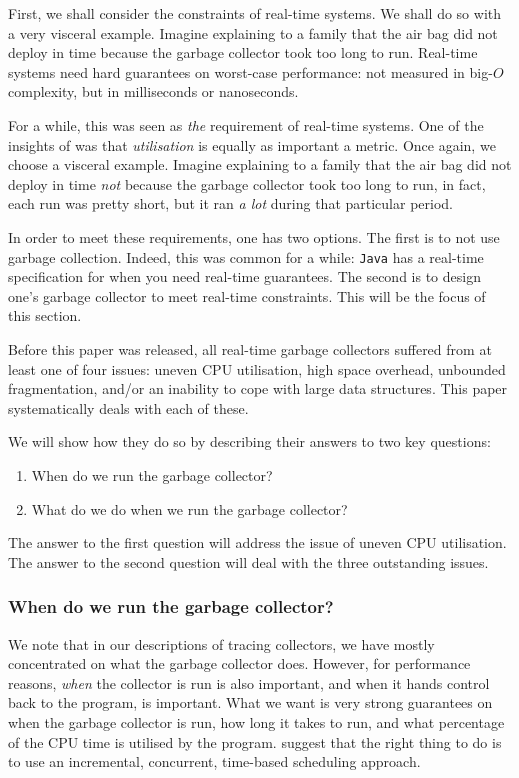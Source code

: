 First, we shall consider the constraints of real-time systems. We shall do so with a very visceral example. Imagine explaining to a family that the air bag did not deploy in time because the garbage collector took too long to run. Real-time systems need hard guarantees on worst-case performance: not measured in big-$O$ complexity, but in milliseconds or nanoseconds. 

For a while, this was seen as \textit{the} requirement of real-time systems. One of the insights of \citet{bacon-2003} was that \textit{utilisation} is equally as important a metric. Once again, we choose a visceral example. Imagine explaining to a family that the air bag did not deploy in time \textit{not} because the garbage collector took too long to run, in fact, each run was pretty short, but it ran \textit{a lot} during that particular period. 

In order to meet these requirements, one has two options. The first is to not use garbage collection. Indeed, this was common for a while: \texttt{Java} has a real-time specification for when you need real-time guarantees. The second is to design one's garbage collector to meet real-time constraints. This will be the focus of this section.

Before this paper was released, all real-time garbage collectors suffered from at least one of four issues: uneven CPU utilisation, high space overhead, unbounded fragmentation, and/or an inability to cope with large data structures. This paper systematically deals with each of these.

We will show how they do so by describing their answers to two key questions:
\begin{enumerate}
    \item When do we run the garbage collector?
    \item What do we do when we run the garbage collector?
\end{enumerate}

The answer to the first question will address the issue of uneven CPU utilisation. The answer to the second question will deal with the three outstanding issues.

\subsubsection{When do we run the garbage collector?}
We note that in our descriptions of tracing collectors, we have mostly concentrated on what the garbage collector does. However, for performance reasons, \textit{when} the collector is run is also important, and when it hands control back to the program, is important. What we want is very strong guarantees on when the garbage collector is run, how long it takes to run, and what percentage of the CPU time is utilised by the program. \citet{bacon-2003} suggest that the right thing to do is to use an incremental, concurrent, time-based scheduling approach.

